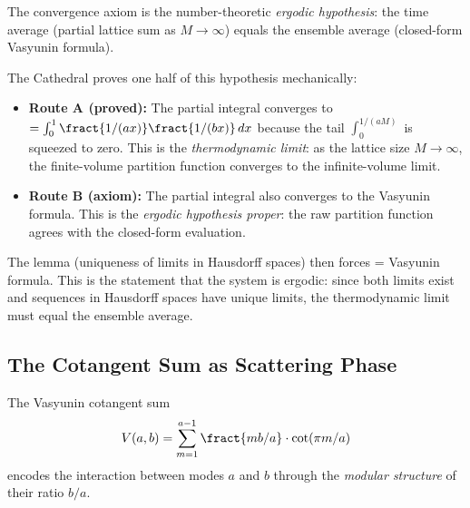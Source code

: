\begin{principle}
The convergence axiom is the number-theoretic \emph{ergodic hypothesis}:
the time average (partial lattice sum as $M \to \infty$) equals the
ensemble average (closed-form Vasyunin formula).

The Cathedral proves one half of this hypothesis mechanically:
\begin{itemize}
  \item \textbf{Route A (proved):} The partial integral converges to
    ~$= \int_0^1 \fract{1/(ax)}\fract{1/(bx)}\,dx$
    because the tail $\int_0^{1/(aM)}$ is squeezed to zero.
    This is the \emph{thermodynamic limit}: as the lattice size
    $M \to \infty$, the finite-volume partition function converges
    to the infinite-volume limit.
  \item \textbf{Route B (axiom):} The partial integral also converges
    to the Vasyunin formula. This is the \emph{ergodic hypothesis proper}:
    the raw partition function agrees with the closed-form evaluation.
\end{itemize}
The  lemma (uniqueness of limits in
Hausdorff spaces) then forces  = Vasyunin formula.
This is the statement that the system is ergodic: since both limits
exist and sequences in Hausdorff spaces have unique limits, the
thermodynamic limit must equal the ensemble average.
\end{principle}

\subsection{The Cotangent Sum as Scattering Phase}

The Vasyunin cotangent sum
\[
  V(a,b) = \sum_{m=1}^{a-1} \fract{mb/a} \cdot \cot(\pi m/a)
\]
encodes the interaction between modes $a$ and $b$ through the
\emph{modular structure} of their ratio $b/a$.


